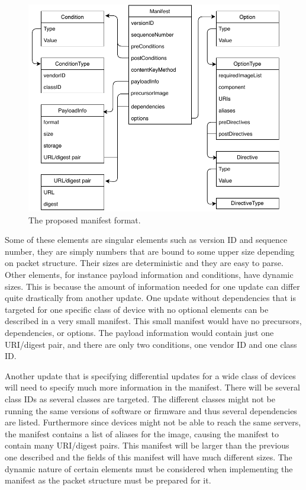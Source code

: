 \documentclass[0-thesis.tex]{subfiles}
\begin{document}
\begin{figure}
    \caption{The proposed manifest format.}
    \label{fig:manifest-format}
    \includegraphics{images/manifest-format.pdf}
\end{figure}

Some of these elements are singular elements such as version ID and sequence number, they
are simply numbers that are bound to some upper size depending on packet structure. Their
sizes are deterministic and they are easy to parse. Other elements, for instance payload
information and conditions, have dynamic sizes. This is because the amount of information
needed for one update can differ quite drastically from another update. One update without
dependencies that is targeted for one specific class of device with no optional elements
can be described in a very small manifest. This small manifest would have no precursors,
dependencies, or options. The payload information would contain just one URI/digest pair,
and there are only two conditions, one vendor ID and one class ID.

Another update that is specifying differential updates for a wide class of devices will
need to specify much more information in the manifest. There will be several class IDs as
several classes are targeted. The different classes might not be running the same versions
of software or firmware and thus several dependencies are listed. Furthermore since
devices might not be able to reach the same servers, the manifest contains a list of
aliases for the image, causing the manifest to contain many URI/digest pairs. This manifest
will be larger than the previous one described and the fields of this manifest will have
much different sizes. The dynamic nature of certain elements must be considered when
implementing the manifest as the packet structure must be prepared for it. 
\end{document}
